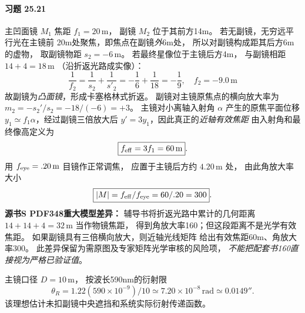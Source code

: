 \paragraph{习题 25.21}
主凹面镜 \(M_1\) 焦距 \(f_1=20\,\mathrm m\)，
副镜 \(M_2\) 位于其前方14m。
若无副镜，无穷远平行光在主镜前
20m处聚焦，即焦点在副镜\emph{外}6m处，
所以对副镜构成距其后方6m的虚物，
取副镜物距 \(s_2=-6\,\mathrm m\)。
若最终星像位于主镜后方4m，
与副镜相距 \(14+4=18\,\mathrm m\)
（沿折返光路成实像）：
\[
\frac1{f_2}=\frac1{s_2}+\frac1{s'_2}
=-\frac16+\frac1{18}=-\frac19,
\quad
\boxed{f_2=-9.0\,\mathrm m}
\]
故副镜为\emph{凸面镜}，形成卡塞格林式折返。
副镜对主镜原焦点的横向放大率为
\(m_2=-s_2'/s_2=-18/(-6)=+3\)。
主镜对小离轴入射角 \(\alpha\) 产生的原焦平面位移
\(y_1\simeq f_1\alpha\)，经过副镜三倍放大后
\(y'=3y_1\)，因此真正的\emph{近轴有效焦距}
由入射角和最终像高定义为
\[
\boxed{f_{\rm eff}=3f_1=60\,\mathrm m}.
\]
用 \(f_{\rm eye}=.20\,\mathrm m\) 目镜作正常调焦，
应置于主镜后方约 \(4.20\,\mathrm m\) 处，
由此角放大率大小
\[
\boxed{|M|=f_{\rm eff}/f_{\rm eye}=60/.20=300}.
\]
\textbf{源书S PDF348重大模型差异：}
辅导书将折返光路中累计的几何距离
\(14+14+4=32\,\mathrm m\) 当作物镜焦距，
得到角放大率160；但这段距离不是光学有效焦距。
如果副镜具有三倍横向放大，则近轴光线矩阵
给出有效焦距60m、角放大率300。
此差异保留为需原图及专家矩阵光学审核的风险项，
\emph{不能把配套书160直接视为严格已验证值}。

主镜口径 \(D=10\,\mathrm m\)，
按波长590nm的衍射限
\[
\boxed{\theta_R=1.22(590\times10^{-9})/10
\simeq7.20\times10^{-8}\,\mathrm{rad}
\simeq0.0149''}.
\]
该理想估计未扣副镜中央遮挡和系统实际衍射传递函数。
